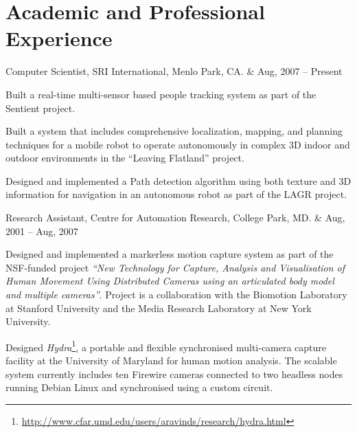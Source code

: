\documentclass[letterpaper]{article}
\begin{document}
\section*{Academic and Professional Experience}
\begin{list1}
 \item
  \begin{tabular1bold}
   Computer Scientist, SRI International, Menlo Park, CA. & Aug, 2007 -- Present\\
  \end{tabular1bold}

  \begin{list2}
   \item Built a real-time multi-sensor based people tracking system as part of
	 the Sentient project.
   \item Built a system that includes comprehensive localization, mapping, and
	 planning techniques for a mobile robot to operate autonomously in complex
	 3D indoor and outdoor environments in the ``Leaving Flatland'' project.
   \item Designed and implemented a Path detection algorithm using both texture
	 and 3D information for navigation in an autonomous robot as part of the
	 LAGR project.
  \end{list2}
  
 \item
  \begin{tabular1bold}
   Research Assistant, Centre for Automation Research, College Park, MD. 
   & Aug, 2001 -- Aug, 2007\\
  \end{tabular1bold}

  \begin{list2}
   \item Designed and implemented a markerless motion capture system as part of the NSF-funded project {\em ``New Technology for Capture, Analysis and Visualisation of Human Movement Using Distributed Cameras using an articulated body model and multiple cameras''}.  Project is a collaboration with the Biomotion Laboratory at Stanford University and the Media Research Laboratory at New York University. 

  \item Designed \emph{Hydra}\footnote{\href{http://www.cfar.umd.edu/users/aravinds/research/hydra.html}{http://www.cfar.umd.edu/users/aravinds/research/hydra.html}}, a portable and flexible synchronised
	multi-camera capture facility at the University of Maryland for human motion
	analysis. The scalable system currently includes ten Firewire cameras
	connected to two headless nodes running Debian Linux and synchronised using
	a custom circuit. 


\end{list2}
\end{list1}
\end{document}
